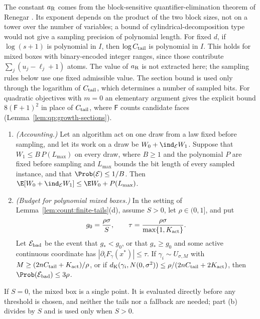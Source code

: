 The constant $a_{\rm R}$ comes from the block-sensitive quantifier-elimination
theorem of Renegar \cite{renegar1992-on-the-computational-complexity-and}.
Its exponent depends on the product of the two block sizes, not on a tower
over the number of variables; a bound of cylindrical-decomposition type would
not give a sampling precision of polynomial length. For fixed $d$, if
$\log(s+1)$ is polynomial in $I$, then $\log C_{\rm tail}$ is polynomial in
$I$. This holds for mixed boxes with binary-encoded integer ranges, since
those contribute $\sum_j(u_j-\ell_j+1)$ atoms. The value of $a_{\rm R}$ is not
extracted here; the sampling rules below use one fixed admissible value. The
section bound is used only through the logarithm of $C_{\rm tail}$, which
determines a number of sampled bits. For quadratic objectives with $m=0$ an
elementary argument gives the explicit bound $8(\mathsf F+1)^2$ in place of
$C_{\rm tail}$, where $\mathsf F$ counts candidate faces
(Lemma~\ref{lem:qp:growth-sections}).

\begin{lemma}\label{lem:count:rare-fallback}
\begin{enumerate}[label=(\alph*)]
\item \emph{(Accounting.)} Let an algorithm act on one draw from a law fixed
 before sampling, and let its work on a draw be $W_0+\ind_{\mathcal E}W_1$.
 Suppose that $W_1\le B\,P(L_{\max})$ on every draw, where $B\ge1$ and the
 polynomial $P$ are fixed before sampling and $L_{\max}$ bounds the bit length
 of every sampled instance, and that $\Prob(\mathcal E)\le1/B$. Then
 $\E[W_0+\ind_{\mathcal E}W_1]\le\E W_0+P(L_{\max})$.
\item \emph{(Budget for polynomial mixed boxes.)} In the setting of
 Lemma~\ref{lem:count:finite-tails}(d), assume $S>0$, let $\rho\in(0,1]$, and
 put
 \[
  g_0=\frac{\rho\sigma}{S},\qquad
  \tau=\frac{\rho\sigma}{\max\{1,K_{\rm act}\}} .
 \]
 Let $\mathcal E_{\rm bad}$ be the event that $g_*<g_0$, or that $g_*\ge g_0$
 and some active continuous coordinate has $|\partial_iF_\gamma(x^*)|\le\tau$.
 If $\gamma_i\sim U_{\sigma,M}$ with
 $M\ge(2nC_{\rm tail}+K_{\rm act})/\rho$, or if
 $d_{\rm K}(\gamma_i,N(0,\sigma^2))\le\rho/(2nC_{\rm tail}+2K_{\rm act})$,
 then $\Prob(\mathcal E_{\rm bad})\le3\rho$.
\end{enumerate}
\end{lemma}

If $S=0$, the mixed box is a single point. It is evaluated directly before
any threshold is chosen, and neither the tails nor a fallback are needed;
part (b) divides by $S$ and is used only when $S>0$.

